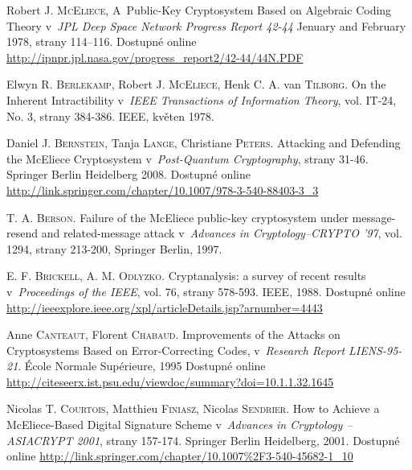 \documentclass[thesis=M,czech,hidelinks]{FITthesis}[2012/06/26]
\newcommand{\0}{{\textcolor[gray]{0.80}{0}}}
\begin{document}
%
%
\begin{thebibliography}{99}

        Robert J. \textsc{McEliece}, A~Public-Key Cryptosystem Based on
        Algebraic Coding Theory v~\emph{JPL Deep Space Network Progress Report
        42-44} Jenuary and February 1978, strany 114–116. Dostupné online
        \url{http://ipnpr.jpl.nasa.gov/progress_report2/42-44/44N.PDF}

        Elwyn R. \textsc{Berlekamp}, Robert J. \textsc{McEliece}, Henk C. A. van
        \textsc{Tilborg}.  On the Inherent Intractibility v~\emph{IEEE
        Transactions of Information Theory}, vol. IT-24, No. 3, strany 384-386.
        IEEE, květen 1978.

        Daniel J. \textsc{Bernstein}, Tanja \textsc{Lange}, Christiane
        \textsc{Peters}. Attacking and Defending the McEliece Cryptosystem
        v~\emph{Post-Quantum Cryptography}, strany 31-46. Springer Berlin
        Heidelberg 2008. Dostupné online
        \url{http://link.springer.com/chapter/10.1007/978-3-540-88403-3\_3}

        T. A. \textsc{Berson}. Failure of the McEliece public-key cryptosystem under
        message-resend and related-message attack v~\emph{Advances in
        Cryptology–CRYPTO ’97}, vol. 1294, strany 213-200, Springer Berlin, 1997.

        E. F. \textsc{Brickell}, A. M. \textsc{Odlyzko}. Cryptanalysis: a survey
        of recent results v~\emph{Proceedings of the IEEE}, vol. 76, strany
        578-593. IEEE, 1988. Dostupné online
        \url{http://ieeexplore.ieee.org/xpl/articleDetails.jsp?arnumber=4443}

        Anne \textsc{Canteaut}, Florent \textsc{Chabaud}. Improvements of
        the Attacks on Cryptosystems Based on Error-Correcting Codes,
        v~\emph{Research Report LIENS-95-21}. École Normale Supérieure, 1995
        Dostupné online
        \url{http://citeseerx.ist.psu.edu/viewdoc/summary?doi=10.1.1.32.1645}

        Nicolas T. \textsc{Courtois}, Matthieu \textsc{Finiasz}, Nicolas
        \textsc{Sendrier}. How to Achieve a McEliece-Based Digital Signature
        Scheme v~\emph{Advances in Cryptology -- ASIACRYPT 2001}, strany
        157-174. Springer Berlin Heidelberg, 2001. Dostupné online
        \url{http://link.springer.com/chapter/10.1007\%2F3-540-45682-1\_10}


\end{thebibliography}
\end{document}
